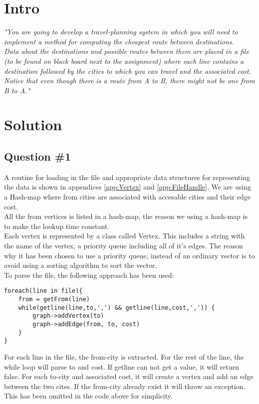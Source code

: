 \section{Intro}
\label{sec:intro}
\textit{"You are going to develop a travel-planning system in which you will need to implement a method for computing the cheapest route between destinations. \\
Data about the destinations and possible routes between them are placed in a file (to be found on black board next to the assignment) where each line contains a destination followed by the cities to which you can travel and the associated cost. \\
Notice that even though there is a route from A to B, there might not be one from B to A."}


\section{Solution}
\subsection{Question \#1}
A routine for loading in the file and appropriate data structures for representing the data is shown in appendices  \ref{app:Vertex} and \ref{app:FileHandle}. We are using a Hash-map where from cities are associated with accesable cities and their edge cost.\\
All the from vertices is listed in a hash-map, the reason we using a hash-map is to make the lookup time constant. \\
Each vertex is represented by a class called Vertex. This includes a string with the name of the vertex, a priority queue including all of it's edges. The reason why it has been chosen to use a priority queue, instead of an ordinary vector is to avoid using a sorting algorithm to sort the vector.\\
To parse the file, the following approach has been used:
\bigskip
\begin{lstlisting}
foreach(line in file){
	from = getFrom(line)
	while(getline(line,to,',') && getline(line,cost,',')) {
		graph->addVertex(to)
		graph->addEdge(from, to, cost)
	}	
}
\end{lstlisting}
\bigskip
For each line in the file, the from-city is extracted. For the rest of the line, the while loop will parse to and cost. If getline can not get a value, it will return false. For each to-city and associated cost, it will create a vertex and add an edge between the two cites. If the from-city already exist it will throw an exception. This has been omitted in the code above for simplicity.


